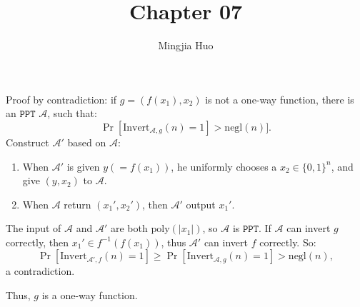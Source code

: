 \documentclass[a4paper]{article}
\newcommand{\poly}{\text{poly}}
\newcommand{\negl}{\text{negl}}
\newcommand{\Invert}{\text{Invert}}
\newcommand{\A}{\mathcal{A}}
\newenvironment{problem}[2][Problem]{\begin{trivlist}
\item[\hskip \labelsep {\bfseries #1}\hskip \labelsep {\bfseries #2.}]}{\end{trivlist}}
\begin{document}
 
 
\title{Chapter 07}
\author{Mingjia Huo}
\date{}
\maketitle

\begin{problem}{7.2}
Proof by contradiction: if $g=(f(x_1),x_2)$ is not a one-way function, there is an $\texttt{PPT}$ $\A$, such that:
\[\Pr[\Invert_{\A,g}(n)=1]>\negl(n)].\]
Construct $\A'$ based on $\A$:
\begin{enumerate}
    \item When $\A'$ is given $y(=f(x_1))$, he uniformly chooses a $x_2\in\{0,1\}^n$, and give $(y,x_2)$ to $\A$.
    \item When $\A$ return $(x_1',x_2')$, then $\A'$ output $x_1'$.
\end{enumerate}
The input of $\A$ and $\A'$ are both $\poly(|x_1|)$, so $\A$ is $\texttt{PPT}$. If $\A$ can invert $g$ correctly, then $x_1'\in f^{-1}(f(x_1))$, thus $\A'$ can invert $f$ correctly. So:
\[\Pr[\Invert_{\A',f}(n)=1]\ge\Pr[\Invert_{\A,g}(n)=1]>\negl(n),\]
a contradiction.\par
Thus, $g$ is a one-way function.
\end{problem}
\end{document}
